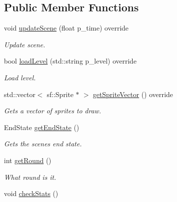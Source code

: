 \subsection*{Public Member Functions}
\begin{DoxyCompactItemize}
\item 
\mbox{\label{class_scene_ac0b5325e1196ae9fb1a4d1d6adde0795}} 
void \mbox{\hyperlink{class_scene_ac0b5325e1196ae9fb1a4d1d6adde0795}{update\+Scene}} (float p\+\_\+time) override
\begin{DoxyCompactList}\small\item\em Update scene. \end{DoxyCompactList}\item 
bool \mbox{\hyperlink{class_scene_a27a8b36b21dd9475d47c13db8cfdae64}{load\+Level}} (std\+::string p\+\_\+level) override
\begin{DoxyCompactList}\small\item\em Load level. \end{DoxyCompactList}\item 
std\+::vector$<$ sf\+::\+Sprite $\ast$ $>$ \mbox{\hyperlink{class_scene_a595b66ffbd3efe4a0dd40f704a84c378}{get\+Sprite\+Vector}} () override
\begin{DoxyCompactList}\small\item\em Gets a vector of sprites to draw. \end{DoxyCompactList}\item 
\mbox{\label{class_scene_a3a3d817613f8d775fd6fb244c54ec5b1}} 
End\+State \mbox{\hyperlink{class_scene_a3a3d817613f8d775fd6fb244c54ec5b1}{get\+End\+State}} ()
\begin{DoxyCompactList}\small\item\em Gets the scenes end state. \end{DoxyCompactList}\item 
\mbox{\label{class_scene_a7c64740eba60afdacf9622122b8a4348}} 
int \mbox{\hyperlink{class_scene_a7c64740eba60afdacf9622122b8a4348}{get\+Round}} ()
\begin{DoxyCompactList}\small\item\em What round is it. \end{DoxyCompactList}\item 
\mbox{\label{class_scene_a507df51d6597c3e84590c579a26d0856}} 
void \mbox{\hyperlink{class_scene_a507df51d6597c3e84590c579a26d0856}{check\+Stats}} ()

\end{DoxyCompactItemize}
